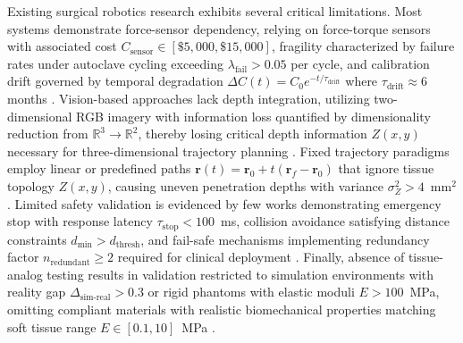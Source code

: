 \documentclass[journal]{IEEEtran}
\begin{document}
Existing surgical robotics research exhibits several critical limitations. Most systems demonstrate force-sensor dependency, relying on force-torque sensors with associated cost $C_{\text{sensor}} \in [\$5,000, \$15,000]$, fragility characterized by failure rates under autoclave cycling exceeding $\lambda_{\text{fail}} > 0.05$ per cycle, and calibration drift governed by temporal degradation $\Delta C(t) = C_0 e^{-t/\tau_{\text{drift}}}$ where $\tau_{\text{drift}} \approx 6$ months \cite{ati2023sensors}. Vision-based approaches lack depth integration, utilizing two-dimensional RGB imagery with information loss quantified by dimensionality reduction from $\mathbb{R}^3 \rightarrow \mathbb{R}^2$, thereby losing critical depth information $Z(x,y)$ necessary for three-dimensional trajectory planning \cite{bodenstedt2018comparative}. Fixed trajectory paradigms employ linear or predefined paths $\mathbf{r}(t) = \mathbf{r}_0 + t(\mathbf{r}_f - \mathbf{r}_0)$ that ignore tissue topology $Z(x,y)$, causing uneven penetration depths with variance $\sigma_Z^2 > 4$~mm$^2$ \cite{yang2020vision}. Limited safety validation is evidenced by few works demonstrating emergency stop with response latency $\tau_{\text{stop}} < 100$~ms, collision avoidance satisfying distance constraints $d_{\min} > d_{\text{thresh}}$, and fail-safe mechanisms implementing redundancy factor $n_{\text{redundant}} \geq 2$ required for clinical deployment \cite{okamura2017challenges}. Finally, absence of tissue-analog testing results in validation restricted to simulation environments with reality gap $\Delta_{\text{sim-real}} > 0.3$ or rigid phantoms with elastic moduli $E > 100$~MPa, omitting compliant materials with realistic biomechanical properties matching soft tissue range $E \in [0.1, 10]$~MPa \cite{misra2010modeling}.
\end{document}
